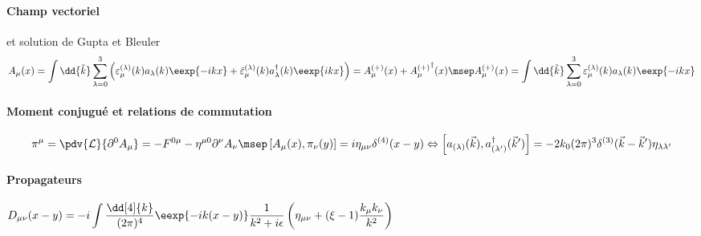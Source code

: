 \documentclass{article}
\begin{document}
\paragraph{Champ vectoriel} et solution de Gupta et Bleuler
\begin{align*}
A_\mu(x) = \int\dd{\tilde{k}} \sum_{\lambda=0}^3 \left( \varepsilon_\mu^{(\lambda)}(k) a_\lambda(k) \eexp{-ikx}
+  \bar{\varepsilon}_\mu^{(\lambda)}(k) a^\dagger_\lambda(k) \eexp{ikx} \right)
= A^{(+)}_\mu(x) + {A^{(+)}_\mu}^\dagger(x)
\msep
A^{(+)}_\mu(x) = \int\dd{\tilde{k}} \sum_{\lambda=0}^3 \varepsilon_\mu^{(\lambda)}(k) a_\lambda(k) \eexp{-ikx}
\end{align*}
\paragraph{Moment conjugué et relations de commutation}
\begin{align*}
\pi^\mu = \pdv{\mathcal{L}}{\partial^0A_\mu} = -F^{0\mu}-\eta^{\mu0}\partial^\nu A_\nu
\msep
\left[ A_\mu(x),\pi_\nu(y)\right] = i \eta_{\mu\nu}\delta^{(4)}(x-y)
\Leftrightarrow
\left[a_{(\lambda)}(\vec{k}),a^\dagger_{(\lambda')}(\vec{k}')\right] = -2k_0(2\pi)^3\delta^{(3)}(\vec{k}-\vec{k}')\eta_{\lambda\lambda'}
\end{align*}
\paragraph{Propagateurs}$\displaystyle
D_{\mu\nu}(x-y) = -i\int\frac{\dd[4]{k}}{(2\pi)^4}\eexp{-ik(x-y)}\frac{1}{k^2+i\epsilon}\left(\eta_{\mu\nu}+(\xi-1)\frac{k_\mu k_\nu}{k^2}\right)
$
\end{document}
